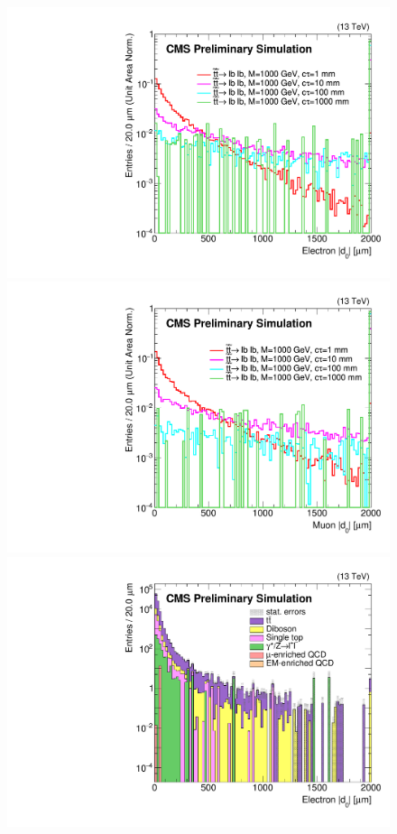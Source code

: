 \begin{figure}
\centering
\includegraphics[scale=0.3]{figures/selection/preselection/signal/electronAbsD0_2000um.pdf}
\includegraphics[scale=0.3]{figures/selection/preselection/signal/muonAbsD0_2000um.pdf}
\includegraphics[scale=0.3]{figures/selection/preselection/bg/electronAbsD0_2000um.pdf}

\end{figure}
